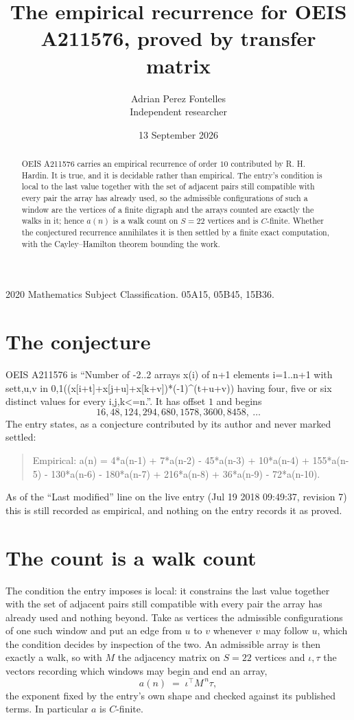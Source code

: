 \documentclass[11pt,a4paper]{article}
\title{The empirical recurrence for OEIS A211576, proved by transfer matrix}
\author{Adrian Perez Fontelles\\ \small Independent researcher}
\date{13 September 2026}
\theoremstyle{plain}
\theoremstyle{definition}
\begin{document}
\maketitle

\begin{abstract}
OEIS A211576 carries an empirical recurrence of order $10$ contributed by R. H. Hardin. It is
true, and it is decidable rather than empirical. The entry's condition is local to the last value together with the set of adjacent pairs still compatible with every pair the array has already used, so
the admissible configurations of such a window are the vertices of a finite digraph and the
arrays counted are exactly the walks in it; hence $a(n)$ is a walk count on $S=22$ vertices
and is $C$-finite. Whether the conjectured recurrence annihilates it is then settled by a
finite exact computation, with the Cayley--Hamilton theorem bounding the work.
\end{abstract}

\noindent\small 2020 Mathematics Subject Classification. 05A15, 05B45, 15B36.\normalsize

\section{The conjecture}

OEIS A211576 is ``Number of -2..2 arrays x(i) of n+1 elements i=1..n+1 with set{t,u,v in 0,1}((x[i+t]+x[j+u]+x[k+v])*(-1)\^{}(t+u+v)) having four, five or six distinct values for every i,j,k<=n.''. It has offset $1$ and begins
\[
16, 48, 124, 294, 680, 1578, 3600, 8458,\ \dots
\]
The entry states, as a conjecture contributed by its author and never marked settled:
\begin{quote}
Empirical: a(n) = 4*a(n-1) + 7*a(n-2) - 45*a(n-3) + 10*a(n-4) + 155*a(n-5) - 130*a(n-6) - 180*a(n-7) + 216*a(n-8) + 36*a(n-9) - 72*a(n-10).
\end{quote}
As of the ``Last modified'' line on the live entry (Jul 19 2018 09:49:37, revision 7) this is still
recorded as empirical, and nothing on the entry records it as proved.

\section{The count is a walk count}

The condition the entry imposes is local: it constrains the last value together with the set of adjacent pairs still compatible with every pair the array has already used and nothing beyond. Take as
vertices the admissible configurations of one such window and put an edge from $u$ to $v$
whenever $v$ may follow $u$, which the condition decides by inspection of the two. An
admissible array is then exactly a walk, so with $M$ the adjacency matrix on $S=22$ vertices
and $\iota,\tau$ the vectors recording which windows may begin and end an array,
\[
a(n)\;=\;\iota^{\!\top}M^{\,n}\tau ,
\]
the exponent fixed by the entry's own shape and checked against its published terms. In
particular $a$ is $C$-finite.
\end{document}
